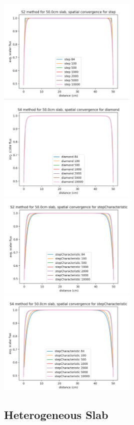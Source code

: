 \documentclass[a4paper]{article}
\begin{document}
\includegraphics[width=0.5\textwidth]{f10}
\includegraphics[width=0.5\textwidth]{f11}\\
\includegraphics[width=0.5\textwidth]{f12}
\includegraphics[width=0.5\textwidth]{f13}\\






\subsection*{Heterogeneous Slab}
\end{document}
